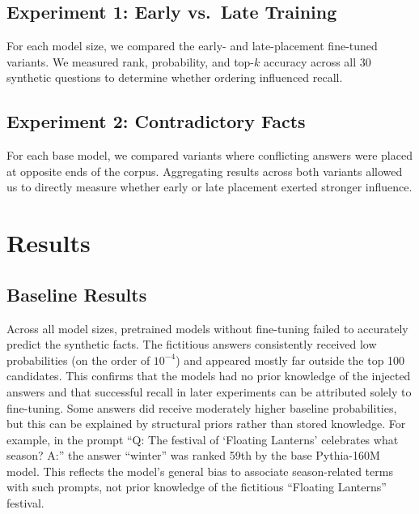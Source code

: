 \documentclass[11pt]{article}
\begin{document}
    \subsection{Experiment 1: Early vs.\ Late Training}
    For each model size, we compared the early- and late-placement fine-tuned variants. We measured rank, probability, and top-$k$ accuracy across all 30 synthetic questions to determine whether ordering influenced recall.

    \subsection{Experiment 2: Contradictory Facts}
    For each base model, we compared variants where conflicting answers were placed at opposite ends of the corpus. Aggregating results across both variants allowed us to directly measure whether early or late placement exerted stronger influence.

    \section{Results}

    \subsection{Baseline Results}
    Across all model sizes, pretrained models without fine-tuning failed to accurately predict the synthetic facts. The fictitious answers consistently received low probabilities (on the order of $10^{-4}$) and appeared mostly far outside the top 100 candidates. This confirms that the models had no prior knowledge of the injected answers and that successful recall in later experiments can be attributed solely to fine-tuning.
    Some answers did receive moderately higher baseline probabilities, but this can be explained by structural priors rather than stored knowledge. For example, in the prompt “Q: The festival of ‘Floating Lanterns’ celebrates what season? A:” the answer “winter” was ranked 59th by the base Pythia-160M model. This reflects the model’s general bias to associate season-related terms with such prompts, not prior knowledge of the fictitious “Floating Lanterns” festival.
\end{document}
